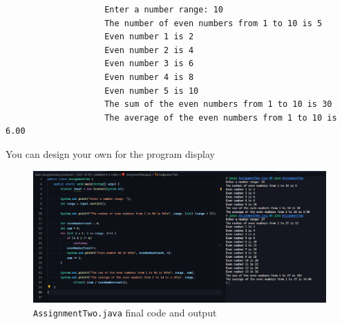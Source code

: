 \documentclass[12pt,titlepage]{article}
\begin{document}
\begin{enumerate}
{\begin{itemize}
{                \begin{verbatim}
                    Enter a number range: 10
                    The number of even numbers from 1 to 10 is 5
                    Even number 1 is 2
                    Even number 2 is 4
                    Even number 3 is 6
                    Even number 4 is 8
                    Even number 5 is 10
                    The sum of the even numbers from 1 to 10 is 30
                    The average of the even numbers from 1 to 10 is 6.00
                \end{verbatim}

                You can design your own for the program display
            }
        \end{itemize}

        \begin{figure}[h]
            \centering
            \includegraphics[width=.9\textwidth]{./images/assignment-two.png}
            \caption{\texttt{AssignmentTwo.java} final code and output}
        \end{figure}
    }
\end{enumerate}
\end{document}
